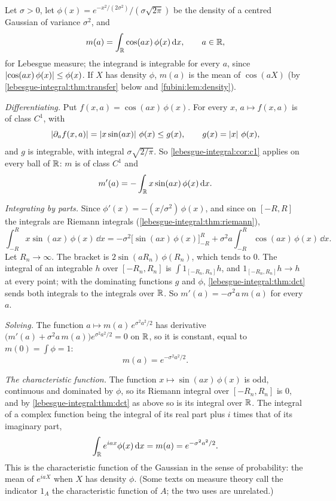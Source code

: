 \begin{notechapter}
\begin{example}
\label{lebesgue-integral:ex:gausscos}
Let $\sigma > 0$, let
$\phi(x) = e^{-x^2/(2\sigma^2)}/(\sigma\sqrt{2\pi})$ be the density of a
centred Gaussian of variance $\sigma^2$, and
\[
  m(a) = \int_{\mathbb{R}}\cos(ax)\,\phi(x)\,\mathrm{d} x , \qquad a\in\mathbb{R} ,
\]
for Lebesgue measure; the integrand is integrable for every $a$, since
$\left|\cos(ax)\,\phi(x)\right|\leq\phi(x)$. If $X$ has density $\phi$,
$m(a)$ is the mean of $\cos(aX)$ (by
\cref{lebesgue-integral:thm:transfer} below and
\cref{fubini:lem:density}).

\emph{Differentiating.} Put $f(x, a) = \cos(ax)\,\phi(x)$. For every
$x$, $a\mapsto f(x, a)$ is of class $C^1$, with
\[
  \left|\partial_af(x, a)\right| = \left|x\sin(ax)\right|\,\phi(x)\leq g(x) ,
  \qquad g(x) = \left|x\right|\,\phi(x) ,
\]
and $g$ is integrable, with integral $\sigma\sqrt{2/\pi}$. So
\cref{lebesgue-integral:cor:c1} applies on every ball of $\mathbb{R}$: $m$ is of
class $C^1$ and
\[
  m'(a) = -\int_{\mathbb{R}} x\sin(ax)\,\phi(x)\,\mathrm{d} x .
\]

\emph{Integrating by parts.} Since $\phi'(x) = -(x/\sigma^2)\,\phi(x)$,
and since on $[-R, R]$ the integrals are Riemann integrals
(\cref{lebesgue-integral:thm:riemann}),
\[
  \int_{-R}^{R}x\sin(ax)\,\phi(x)\,\dd x
  = -\sigma^2\bigl[\sin(ax)\,\phi(x)\bigr]_{-R}^{R}
    + \sigma^2a\int_{-R}^{R}\cos(ax)\,\phi(x)\,\dd x .
\]
Let $R_n\to\infty$. The bracket is $2\sin(aR_n)\,\phi(R_n)$, which
tends to $0$. The integral of an integrable $h$ over $[-R_n, R_n]$ is
$\int1_{[-R_n, R_n]}h$, and $1_{[-R_n, R_n]}h\to h$ at every point;
with the dominating functions $g$ and $\phi$,
\cref{lebesgue-integral:thm:dct} sends both integrals to the integrals
over $\mathbb{R}$. So $m'(a) = -\sigma^2a\,m(a)$ for every $a$.

\emph{Solving.} The function $a\mapsto m(a)\,e^{\sigma^2a^2/2}$ has
derivative $\bigl(m'(a) + \sigma^2a\,m(a)\bigr)e^{\sigma^2a^2/2} = 0$ on
$\mathbb{R}$, so it is constant, equal to $m(0) = \int\phi = 1$:
\[
  m(a) = e^{-\sigma^2a^2/2} .
\]

\emph{The characteristic function.} The function
$x\mapsto\sin(ax)\,\phi(x)$ is odd, continuous and dominated by $\phi$,
so its Riemann integral over $[-R_n, R_n]$ is $0$, and by
\cref{lebesgue-integral:thm:dct} as above so is its integral over $\mathbb{R}$.
The integral of a complex function being the integral of its real part
plus $i$ times that of its imaginary part,
\[
  \int_{\mathbb{R}} e^{iax}\phi(x)\,\mathrm{d} x = m(a) = e^{-\sigma^2a^2/2} .
\]
This is the characteristic function of the Gaussian in the sense of
probability: the mean of $e^{iaX}$ when $X$ has density $\phi$. (Some
texts on measure theory call the indicator $1_A$ the characteristic
function of $A$; the two uses are unrelated.)
\end{example}


\end{notechapter}
